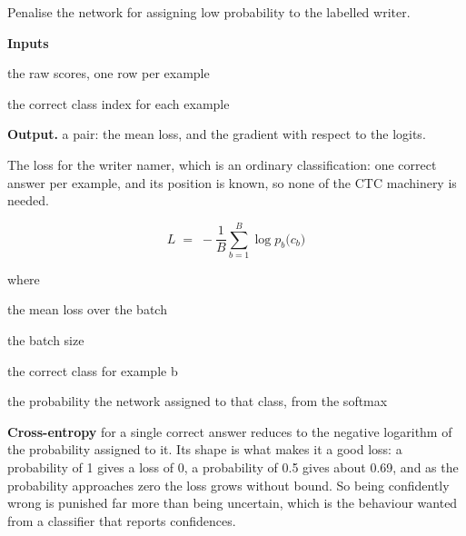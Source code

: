 Penalise the network for assigning low probability to the labelled writer.




\noindent\textbf{Inputs}
\begin{description}[leftmargin=2.2em,style=nextline,font=\normalfont\ttfamily]\setlength\itemsep{1pt}
  \item[{logits}] \normalfont the raw scores, one row per example
  \item[{targetIdx}] \normalfont the correct class index for each example
\end{description}

\noindent\textbf{Output.} a pair: the mean loss, and the gradient with respect to the logits.


The loss for the writer namer, which is an ordinary classification: one correct answer per example, and its position is known, so none of the CTC machinery is needed.


\begin{equation}
L \;=\; -\frac{1}{B}\sum_{b=1}^{B} \log p_b\big(c_b\big)
\end{equation}

\noindent where
\begin{description}[leftmargin=2.4em,style=nextline,font=\normalfont\ttfamily]\setlength\itemsep{1pt}
  \item[{$L$}] \normalfont the mean loss over the batch
  \item[{$B$}] \normalfont the batch size
  \item[{$c_b$}] \normalfont the correct class for example b
  \item[{$p_b(c_b)$}] \normalfont the probability the network assigned to that class, from the softmax
\end{description}

\textbf{Cross-entropy} for a single correct answer reduces to the negative logarithm of the probability assigned to it. Its shape is what makes it a good loss: a probability of 1 gives a loss of 0, a probability of 0.5 gives about 0.69, and as the probability approaches zero the loss grows without bound. So being confidently wrong is punished far more than being uncertain, which is the behaviour wanted from a classifier that reports confidences.



